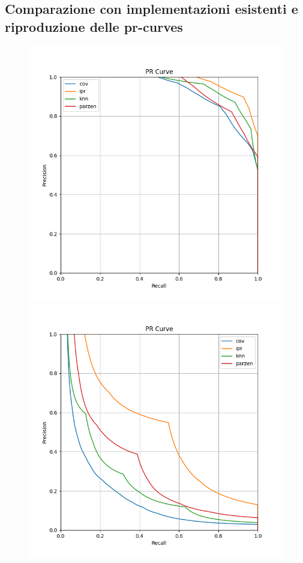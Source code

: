 \subsection{Comparazione con implementazioni esistenti e riproduzione delle pr-curves}

\begin{figure}[h!]
    \centering
    \includegraphics[width=\linewidth]{../images/toyexperiments/prcurves/PRCurve_k4_s1.png} 
    \includegraphics[width=\linewidth]{../images/toyexperiments/prcurves/PRCurve_k4_s3.png}

\end{figure}
